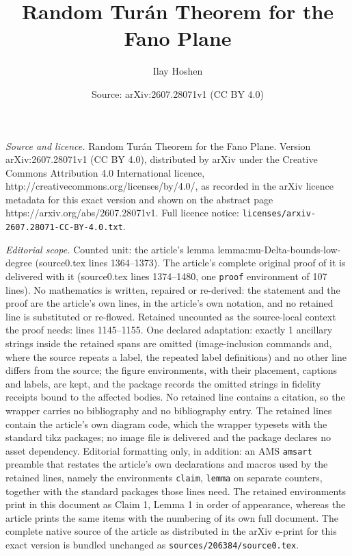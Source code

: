 \documentclass[10pt,a4paper]{amsart}
\title{Random Tur\'an Theorem for the Fano Plane}
\author{Ilay Hoshen}
\date{Source: arXiv:2607.28071v1 (CC BY 4.0)}
\begin{document}
\maketitle

\noindent\emph{Source and licence.} Random Tur\'an Theorem for the Fano Plane. Version arXiv:2607.28071v1 (CC BY 4.0), distributed by arXiv under the Creative Commons Attribution 4.0 International licence, http://creativecommons.org/licenses/by/4.0/, as recorded in the arXiv licence metadata for this exact version and shown on the abstract page https://arxiv.org/abs/2607.28071v1. Full licence notice: \texttt{licenses/arxiv-2607.28071-CC-BY-4.0.txt}.\par\smallskip

\noindent\textit{Editorial scope.} Counted unit: the article's lemma lemma:mu-Delta-bounds-low-degree (source0.tex lines 1364--1373). The article's complete original proof of it is delivered with it (source0.tex lines 1374--1480, one \texttt{proof} environment of 107 lines). No mathematics is written, repaired or re-derived: the statement and the proof are the article's own lines, in the article's own notation, and no retained line is substituted or re-flowed.  Retained uncounted as the source-local context the proof needs: lines 1145--1155.  One declared adaptation: exactly 1 ancillary strings inside the retained spans are omitted (image-inclusion commands and, where the source repeats a label, the repeated label definitions) and no other line differs from the source; the figure environments, with their placement, captions and labels, are kept, and the package records the omitted strings in fidelity receipts bound to the affected bodies.  No retained line contains a citation, so the wrapper carries no bibliography and no bibliography entry.  The retained lines contain the article's own diagram code, which the wrapper typesets with the standard tikz packages; no image file is delivered and the package declares no asset dependency.  Editorial formatting only, in addition: an AMS \texttt{amsart} preamble that restates the article's own declarations and macros used by the retained lines, namely the environments \texttt{claim}, \texttt{lemma} on separate counters, together with the standard packages those lines need.  The retained environments print in this document as Claim 1, Lemma 1 in order of appearance, whereas the article prints the same items with the numbering of its own full document.  The complete native source of the article as distributed in the arXiv e-print for this exact version is bundled unchanged as \texttt{sources/206384/source0.tex}.
\end{document}
